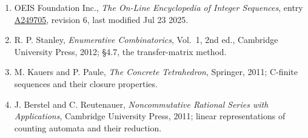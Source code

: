 \documentclass[11pt]{article}
\theoremstyle{definition}
\begin{document}
\begin{enumerate}

\item OEIS Foundation Inc., \emph{The On-Line Encyclopedia of Integer Sequences}, entry \href{https://oeis.org/A249705}{A249705}, revision 6, last modified Jul 23 2025.

\item R. P. Stanley, \emph{Enumerative Combinatorics}, Vol.~1, 2nd ed., Cambridge University Press, 2012; \S4.7, the transfer-matrix method.

\item M. Kauers and P. Paule, \emph{The Concrete Tetrahedron}, Springer, 2011; C-finite sequences and their closure properties.

\item J. Berstel and C. Reutenauer, \emph{Noncommutative Rational Series with Applications}, Cambridge University Press, 2011; linear representations of counting automata and their reduction.

\end{enumerate}
\end{document}
